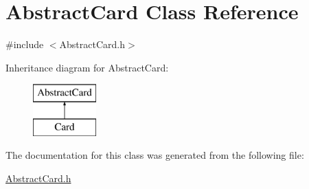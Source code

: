 \hypertarget{class_abstract_card}{}\section{Abstract\+Card Class Reference}
\label{class_abstract_card}


{\ttfamily \#include $<$Abstract\+Card.\+h$>$}

Inheritance diagram for Abstract\+Card\+:\begin{figure}[H]
\begin{center}
\leavevmode
\includegraphics[height=2.000000cm]{class_abstract_card}
\end{center}
\end{figure}


The documentation for this class was generated from the following file\+:\begin{DoxyCompactItemize}
\item 
\mbox{\hyperlink{_abstract_card_8h}{Abstract\+Card.\+h}}\end{DoxyCompactItemize}
